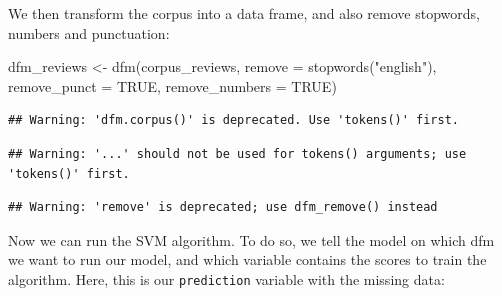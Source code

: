 \documentclass[
]{book}
\newenvironment{Shaded}{\begin{snugshade}}{\end{snugshade}}
\newcommand{\AttributeTok}[1]{\textcolor[rgb]{0.77,0.63,0.00}{#1}}
\newcommand{\ConstantTok}[1]{\textcolor[rgb]{0.00,0.00,0.00}{#1}}
\newcommand{\DecValTok}[1]{\textcolor[rgb]{0.00,0.00,0.81}{#1}}
\newcommand{\FloatTok}[1]{\textcolor[rgb]{0.00,0.00,0.81}{#1}}
\newcommand{\FunctionTok}[1]{\textcolor[rgb]{0.00,0.00,0.00}{#1}}
\newcommand{\NormalTok}[1]{#1}
\newcommand{\OtherTok}[1]{\textcolor[rgb]{0.56,0.35,0.01}{#1}}
\newcommand{\SpecialCharTok}[1]{\textcolor[rgb]{0.00,0.00,0.00}{#1}}
\newcommand{\StringTok}[1]{\textcolor[rgb]{0.31,0.60,0.02}{#1}}
\begin{document}
\begin{Shaded}
\end{Shaded}

We then transform the corpus into a data frame, and also remove stopwords, numbers and punctuation:

\begin{Shaded}
\begin{Highlighting}[]
\NormalTok{dfm\_reviews }\OtherTok{\textless{}{-}} \FunctionTok{dfm}\NormalTok{(corpus\_reviews, }\AttributeTok{remove =} \FunctionTok{stopwords}\NormalTok{(}\StringTok{"english"}\NormalTok{), }\AttributeTok{remove\_punct =} \ConstantTok{TRUE}\NormalTok{, }\AttributeTok{remove\_numbers =} \ConstantTok{TRUE}\NormalTok{)}
\end{Highlighting}
\end{Shaded}

\begin{verbatim}
## Warning: 'dfm.corpus()' is deprecated. Use 'tokens()' first.
\end{verbatim}

\begin{verbatim}
## Warning: '...' should not be used for tokens() arguments; use 'tokens()' first.
\end{verbatim}

\begin{verbatim}
## Warning: 'remove' is deprecated; use dfm_remove() instead
\end{verbatim}

Now we can run the SVM algorithm. To do so, we tell the model on which dfm we want to run our model, and which variable contains the scores to train the algorithm. Here, this is our \texttt{prediction} variable with the missing data:
\end{document}
